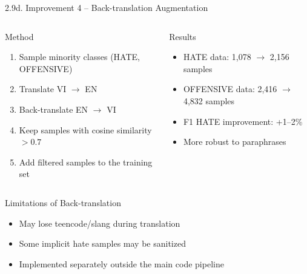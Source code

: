 \documentclass[11pt, aspectratio=169]{beamer}
\begin{document}
\begin{frame}[shrink=5]{2.9d. Improvement 4 -- Back-translation Augmentation}

\begin{columns}[T]
  \begin{block}{Method}
    \begin{enumerate}
      \item Sample minority classes (HATE, OFFENSIVE)
      \item Translate VI $\rightarrow$ EN
      \item Back-translate EN $\rightarrow$ VI
      \item Keep samples with cosine similarity $> 0.7$
      \item Add filtered samples to the training set
    \end{enumerate}
  \end{block}

  \begin{block}{Results}
    \begin{itemize}
      \item HATE data: 1,078 $\rightarrow$ 2,156 samples
      \item OFFENSIVE data: 2,416 $\rightarrow$ 4,832 samples
      \item F1 HATE improvement: +1--2\%
      \item More robust to paraphrases
    \end{itemize}
  \end{block}
\end{columns}

\vspace{0.3cm}
\begin{block}{Limitations of Back-translation}
  \begin{itemize}
    \item May lose teencode/slang during translation
    \item Some implicit hate samples may be sanitized
    \item Implemented separately outside the main code pipeline
  \end{itemize}
\end{block}
\end{frame}
\end{document}
